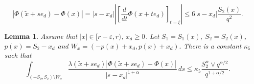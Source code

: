 \documentclass[10pt,a4paper]{amsart}
\newtheorem{lemma}{Lemma}
\newcommand{\eps}{\varepsilon}
\begin{document}
\begin{equation}\label{diff1}
\left| \varPhi(\tilde{x} + s e_d) - \varPhi(x) \right| =
|s-x_d| \left| \left[\frac{d}{dt}\varPhi(x + t e_d)\right]_{t = \xi} \right|
\le 6 |s-x_d| \frac{S_2(x)}{q^{2} }.
\end{equation}

\begin{lemma}\label{Case2L}
Assume that $|x| \in [r - \eps, r)$, $x_d \ge 0$. Let $S_1= S_1(x)$, $S_2= S_2(x)$,
 $p(x)=S_2-x_d$ and $W_x = (-p(x)+x_d,p(x)+x_d) $. There is a constant $\kappa_5$ such that
$$ 
\int_{(-S_2, S_2) \setminus W_x}
\frac{\lambda(\tilde{x} + s e_d) |\varPhi(\tilde{x} + s e_d) - \varPhi(x)|}{|s - x_d|^{1 + \alpha}} \, ds 
\le \kappa_5 \frac{S^{\alpha}_2\vee q^{\alpha/2}}{q^{1+\alpha/2} }.
$$  
\end{lemma}
\end{document}
